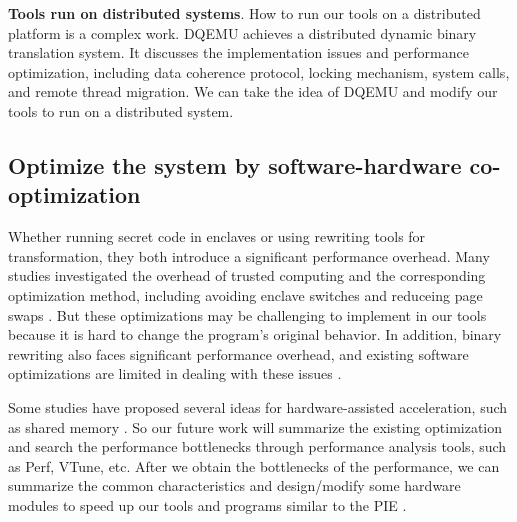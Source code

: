 \textbf{Tools run on distributed systems}.
How to run our tools on a distributed platform is a complex work.
DQEMU \cite{Zhao2020DQEMUAS} achieves a distributed dynamic binary translation system.
It discusses the implementation issues and performance optimization, including
data coherence protocol, locking mechanism, system calls, and remote thread migration.
We can take the idea of DQEMU and modify our tools to run on a distributed system.

\subsection{Optimize the system by software-hardware co-optimization}
\label{sec:ToolWithOptimization}
Whether running secret code in enclaves or using rewriting tools for transformation,
they both introduce a significant performance overhead.
Many studies investigated the overhead of trusted computing and
the corresponding optimization method, including avoiding enclave switches
\cite{Tian2018SwitchlessCM} and reduceing page swaps \cite{Orenbach2017EleosEO, Taassori2018VAULTRP}.
But these optimizations may be challenging to implement in our tools because it is hard
to change the program's original behavior.
In addition, binary rewriting also faces significant performance overhead, and existing
software optimizations are limited in dealing with these issues \cite{Kim2003HardwareSF}.

Some studies have proposed several ideas for hardware-assisted acceleration, such as
shared memory \cite{Jiang2022CRONUSFS}.
So our future work will summarize the existing optimization and search the performance
bottlenecks through performance analysis tools, such as Perf, VTune, etc.
After we obtain the bottlenecks of the performance, we can summarize the common characteristics
and design/modify some hardware modules to speed up our tools and programs similar to
the PIE \cite{Schneider2021PIEAP}.